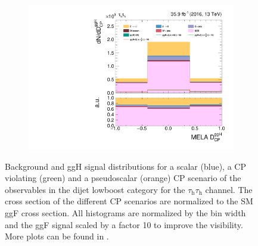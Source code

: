 \begin{figure}[h!]
\begin{subfigure}{.32\textwidth}
        \includegraphics[width=\textwidth]{Figures/eventselection/tt/dijet2D_lowboost/melaDiscriminatorDCPGGH.pdf}
    \end{subfigure} %
    \caption[\textit{Dijet lowboost} background modeling in the \tautau{} channel.]{Background and ggH signal distributions for a scalar (blue), a CP violating (green) and a pseudoscalar (orange) CP scenario of the observables in the dijet lowboost category for the $\tau_\text{h}\tau_\text{h}$ channel. 
    The cross section of the different CP scenarios are normalized to the SM ggF cross section.
    All histograms are normalized by the bin width and the ggF signal scaled by a factor 10 to improve the visibility. More plots can be found in .}\label{ES:controlplots:2jet_lowboost}  
\end{figure}%

